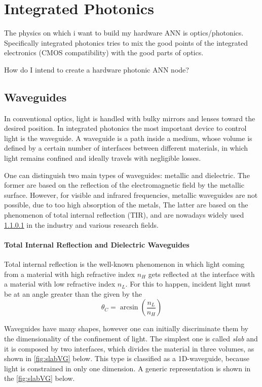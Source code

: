\chapter{Integrated Photonics}
\label{ch:Integrated_Photonics}

The physics on which i want to build my hardware ANN is optics/photonics.
Specifically integrated photonics tries to mix the good points of the integrated electronics (CMOS compatibility) with the good parts of optics.

How do I intend to create a hardware photonic ANN node?

\section{Waveguides}
\label{sec:Waveguides}
In conventional optics, light is handled with bulky mirrors and lenses toward the desired position.
In integrated photonics the most important device to control light is the waveguide.
A waveguide is a path inside a medium, whose volume is defined by a certain number of interfaces between different materials, in which light remains confined and ideally travels with negligible losses.

One can distinguish two main types of waveguides: metallic and dielectric.
The former are based on the reflection of the electromagnetic field by the metallic surface.
However, for visible and infrared frequencies, metallic waveguides are not possible, due to too high absorption of the metals,
The latter are based on the phenomenon of total internal reflection (TIR), and are nowadays widely used \ref{} in the industry and various research fields.

\subsubsection{Total Internal Reflection and Dielectric Waveguides}
Total internal reflection is the well-known phenomenon in which light coming from a material with high refractive index $n_H$ gets reflected at the interface with a material with low refractive index $n_L$.
For this to happen, incident light must be at an angle greater than the  given by the 
\begin{equation*}
	\theta_C = \arcsin \left( \dfrac{n_L}{n_H}\right)
\end{equation*}


Waveguides have many shapes, however one can initially discriminate them by the dimensionality of the confinement of light.
The simplest one is called \textit{slab} and it is composed by two interfaces, which divides the material in three volumes, as shown in \autoref{fig:slabVG} below.
This type is classified as a 1D-waveguide, because light is constrained in only one dimension.
A generic representation is shown in the \autoref{fig:slabVG} below.

